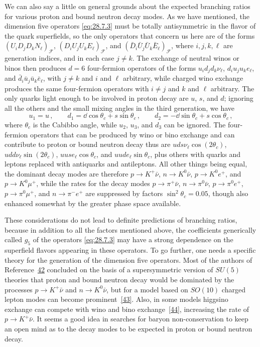 We can also say a little on general grounds about the expected branching
ratios for various proton and bound neutron decay modes. As we have
mentioned, the dimension five operators \eqref{eq:28.7.3} must be totally
antisymmetric in the flavor of the quark superfields, so the only operators
that concern us here are of the forms
\((U_iD_jD_kN_\ell)_{\mathcal F}\),
\((D_iU_jU_kE_\ell)_{\mathcal F}\), and
\((\bar D_i\bar U_j\bar U_k\bar E_\ell)_{\mathcal F}\), where
\(i,j,k,\ell\) are generation indices, and in each case \(j\ne k\). The
exchange of neutral winos or binos then produces \(d=6\) four-fermion
operators of the forms \(u_id_jd_k\nu_\ell\), \(d_iu_ju_ke_\ell\), and
\(\bar d_i\bar u_j\bar u_k\bar e_\ell\), with \(j\ne k\) and \(i\) and
\(\ell\) arbitrary, while charged wino exchange produces the same
four-fermion operators with \(i\ne j\) and \(k\) and \(\ell\) arbitrary.
The only quarks light enough to be involved in proton decay are \(u\),
\(s\), and \(d\); ignoring all the others and the small mixing angles in
the third generation, we have
\[
  u_1=u\,,
  \qquad
  d_1=\dd\cos\theta_c+s\sin\theta_c\,,
  \qquad
  d_2=-\dd\sin\theta_c+s\cos\theta_c\,,
\]
where \(\theta_c\) is the Cabibbo angle, while \(u_2\), \(u_3\), and \(d_3\)
can be ignored. The four-fermion operators that can be produced by wino or
bino exchange and can contribute to proton or bound neutron decay thus are
\(uds\nu_\ell\cos(2\theta_c)\), \(udd\nu_\ell\sin(2\theta_c)\),
\(uuse_\ell\cos\theta_c\), and \(uude_\ell\sin\theta_c\), plus others with
quarks and leptons replaced with antiquarks and antileptons. All other
things being equal, the dominant decay modes are therefore
\(p\longrightarrow K^+\bar\nu\), \(n\longrightarrow K^0\bar\nu\),
\(p\longrightarrow K^0e^+\), and \(p\longrightarrow K^0\mu^+\), while the
rates for the decay modes \(p\longrightarrow\pi^+\bar\nu\),
\(n\longrightarrow\pi^0\bar\nu\), \(p\longrightarrow\pi^0e^+\),
\(p\longrightarrow\pi^0\mu^+\), and \(n\longrightarrow\pi^-e^+\) are
suppressed by factors \(\sin^2\theta_c=0.05\), though also enhanced
somewhat by the greater phase space available.

These considerations do not lead to definite predictions of branching
ratios, because in addition to all the factors mentioned above, the
coefficients generically called \(g_5\) of the operators
\eqref{eq:28.7.3} may have a strong dependence on the superfield flavors
appearing in these operators. To go further, one needs a specific theory
for the generation of the dimension five operators. Most of the authors of
Reference~\hyperref[ch28-ref-42]{42} concluded on the basis of a
supersymmetric version of \(SU(5)\) theories that proton and bound neutron
decay would be dominated by the processes \(p\longrightarrow K^+\bar\nu\)
and \(n\longrightarrow K^0\bar\nu\), but for a model based on \(SO(10)\)
charged lepton modes can become prominent~\hyperref[ch28-ref-43]{[43]}.
Also, in some models higgsino exchange can compete with wino and bino
exchange~\hyperref[ch28-ref-44]{[44]}, increasing the rate
of \(p\longrightarrow K^+\bar\nu\). It seems a good idea in searches for
baryon non-conservation to keep an open mind as to the decay modes to be
expected in proton or bound neutron decay.

